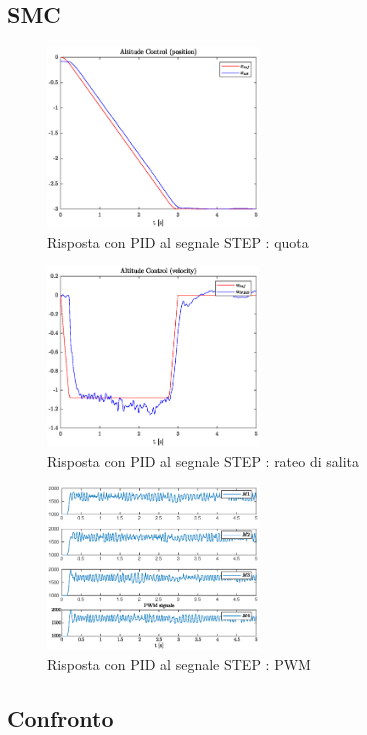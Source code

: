 \clearpage
\subsection{SMC}
\begin{figure}
	\centering
	\includegraphics[width=0.5\textwidth]{Simulazioni/Figure/STEPaltitudecontrolposSMC}
	\caption{Risposta con PID al segnale STEP : quota}
\end{figure}

\begin{figure}
	\centering
	\includegraphics[width=0.5\textwidth]{Simulazioni/Figure/STEPaltitudecontrolvelSMC}
	\caption{Risposta con PID al segnale STEP : rateo di salita}
\end{figure}

\begin{figure}
	\centering
	\includegraphics[width=0.5\textwidth]{Simulazioni/Figure/STEPpwmSMC}
	\caption{Risposta con PID al segnale STEP : PWM}
\end{figure}

\clearpage
\subsection{Confronto}